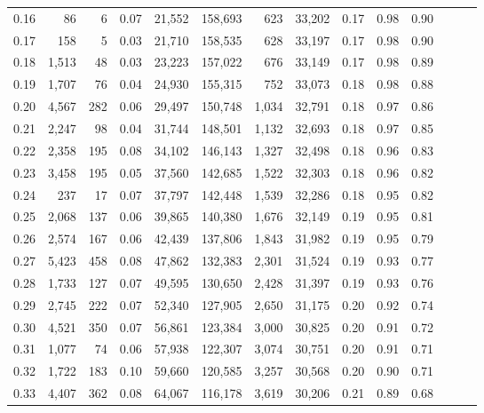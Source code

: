 \begin{tabular}{rrrrrrrrrrrrrr}
0.16 &      86 &      6 &  0.07 &   21,552 &  158,693 &     623 &  33,202 &  0.17 &  0.98 &      0.90 \\
0.17 &     158 &      5 &  0.03 &   21,710 &  158,535 &     628 &  33,197 &  0.17 &  0.98 &      0.90 \\
0.18 &   1,513 &     48 &  0.03 &   23,223 &  157,022 &     676 &  33,149 &  0.17 &  0.98 &      0.89 \\
0.19 &   1,707 &     76 &  0.04 &   24,930 &  155,315 &     752 &  33,073 &  0.18 &  0.98 &      0.88 \\
0.20 &   4,567 &    282 &  0.06 &   29,497 &  150,748 &   1,034 &  32,791 &  0.18 &  0.97 &      0.86 \\
0.21 &   2,247 &     98 &  0.04 &   31,744 &  148,501 &   1,132 &  32,693 &  0.18 &  0.97 &      0.85 \\
0.22 &   2,358 &    195 &  0.08 &   34,102 &  146,143 &   1,327 &  32,498 &  0.18 &  0.96 &      0.83 \\
0.23 &   3,458 &    195 &  0.05 &   37,560 &  142,685 &   1,522 &  32,303 &  0.18 &  0.96 &      0.82 \\
0.24 &     237 &     17 &  0.07 &   37,797 &  142,448 &   1,539 &  32,286 &  0.18 &  0.95 &      0.82 \\
0.25 &   2,068 &    137 &  0.06 &   39,865 &  140,380 &   1,676 &  32,149 &  0.19 &  0.95 &      0.81 \\
0.26 &   2,574 &    167 &  0.06 &   42,439 &  137,806 &   1,843 &  31,982 &  0.19 &  0.95 &      0.79 \\
0.27 &   5,423 &    458 &  0.08 &   47,862 &  132,383 &   2,301 &  31,524 &  0.19 &  0.93 &      0.77 \\
0.28 &   1,733 &    127 &  0.07 &   49,595 &  130,650 &   2,428 &  31,397 &  0.19 &  0.93 &      0.76 \\
0.29 &   2,745 &    222 &  0.07 &   52,340 &  127,905 &   2,650 &  31,175 &  0.20 &  0.92 &      0.74 \\
0.30 &   4,521 &    350 &  0.07 &   56,861 &  123,384 &   3,000 &  30,825 &  0.20 &  0.91 &      0.72 \\
0.31 &   1,077 &     74 &  0.06 &   57,938 &  122,307 &   3,074 &  30,751 &  0.20 &  0.91 &      0.71 \\
0.32 &   1,722 &    183 &  0.10 &   59,660 &  120,585 &   3,257 &  30,568 &  0.20 &  0.90 &      0.71 \\
0.33 &   4,407 &    362 &  0.08 &   64,067 &  116,178 &   3,619 &  30,206 &  0.21 &  0.89 &      0.68 \\

\end{tabular}
